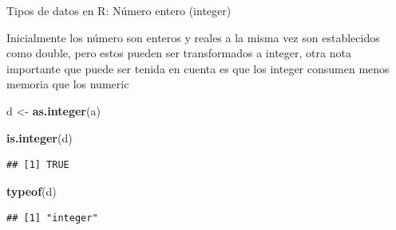 \documentclass[ignorenonframetext,]{beamer}
\newenvironment{Shaded}{\begin{snugshade}}{\end{snugshade}}
\newcommand{\KeywordTok}[1]{\textcolor[rgb]{0.13,0.29,0.53}{\textbf{#1}}}
\newcommand{\StringTok}[1]{\textcolor[rgb]{0.31,0.60,0.02}{#1}}
\newcommand{\NormalTok}[1]{#1}
\begin{document}
\begin{frame}[fragile]{Tipos de datos en R: Número entero (integer)}

Inicialmente los número son enteros y reales a la misma vez son
establecidos como double, pero estos pueden ser transformados a integer,
otra nota importante que puede ser tenida en cuenta es que los integer
consumen menos memoria que los numeric

\begin{Shaded}
\begin{Highlighting}[]
\NormalTok{d <-}\StringTok{ }\KeywordTok{as.integer}\NormalTok{(a)}
\end{Highlighting}
\end{Shaded}

\begin{Shaded}
\begin{Highlighting}[]
\KeywordTok{is.integer}\NormalTok{(d)}
\end{Highlighting}
\end{Shaded}

\begin{verbatim}
## [1] TRUE
\end{verbatim}

\begin{Shaded}
\begin{Highlighting}[]
\KeywordTok{typeof}\NormalTok{(d)}
\end{Highlighting}
\end{Shaded}

\begin{verbatim}
## [1] "integer"
\end{verbatim}

\end{frame}
\end{document}
